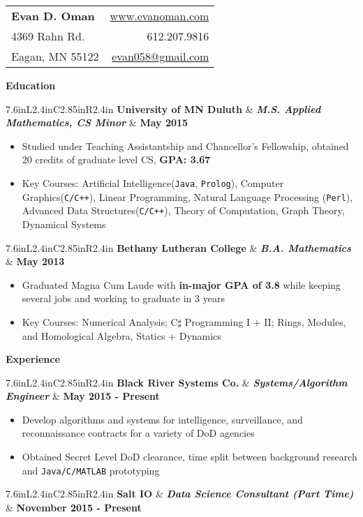 \documentclass[letterpaper,10pt]{article}
\newcommand{\myitem}{\item[$\triangleright$]}
\newcommand{\resitem}[1]{\item[$\triangleright$] #1 

\vspace{-.1in}
}
\newcommand{\resheading}[1]{
	{
		\large\colorbox{mygrey}
		{
			\begin{minipage}{.98\textwidth}

			\centerline{\textbf{#1 \vphantom{p\^{E}}}}
			\end{minipage}
		}
	}
}
\newcommand{\rressubheading}[3]{
	\begin{tabular*}{7.6in}{L{2.4in}C{2.85in}R{2.4in}}
			\textbf{#1} & \textit{\textbf{#2}}  & \textbf{#3}
	\end{tabular*}\vspace{-12pt}
}
\begin{document}
	\begin{tabular*}{7.6in}{l@{\extracolsep{\fill}}r}
		\textbf{\Large Evan D. Oman}  &  \href{http://www.evanoman.com}{www.evanoman.com} \\
		4369 Rahn Rd. & 612.207.9816\\
		Eagan, MN 55122& \href{mailto:evan058@gmail.com}{evan058@gmail.com}\\
	\end{tabular*}
	\vspace{0.1in}
	\resheading{Education}
		\rressubheading{University of MN Duluth}{M.S. Applied Mathematics, CS Minor}{May 2015}
			\vspace{-.1in}
			\begin{itemize}
				\resitem{Studied under Teaching Assistantship and Chancellor's Fellowship, obtained 20 credits of graduate level CS, \textbf{GPA: 3.67}}
				\myitem Key Courses: Artificial Intelligence(\verb!Java!, \verb!Prolog!), Computer Graphics(\verb!C/C++!), Linear Programming, Natural Language Processing (\verb!Perl!), Advanced Data Structures(\verb!C/C++!), Theory of Computation, Graph Theory, Dynamical Systems
			\end{itemize}
		\rressubheading{Bethany Lutheran College}{B.A. Mathematics}{May 2013}
			\vspace{-.1in}
			\begin{itemize}
				\resitem{Graduated Magna Cum Laude with \textbf{in-major GPA of 3.8} while keeping several jobs and working to graduate in 3 years}
				\resitem{Key Courses: Numerical Analysis; C$\sharp$ Programming I + II; Rings, Modules, and Homological Algebra, Statics + Dynamics}
			\end{itemize}
			\vspace{.1in}
	\resheading{Experience}
		\rressubheading{Black River Systems Co.}{Systems/Algorithm Engineer}{May 2015 - Present}
			\vspace{-.1in}
			\begin{itemize}
				\resitem{Develop algorithms and systems for intelligence, surveillance, and reconnaissance contracts for a variety of DoD agencies}
				\myitem Obtained Secret Level DoD clearance, time split between background research and \verb!Java/C/MATLAB! prototyping
			\end{itemize}
		\rressubheading{Salt IO}{Data Science Consultant (Part Time)}{November 2015 - Present}
			\vspace{-.1in}
\end{document}
